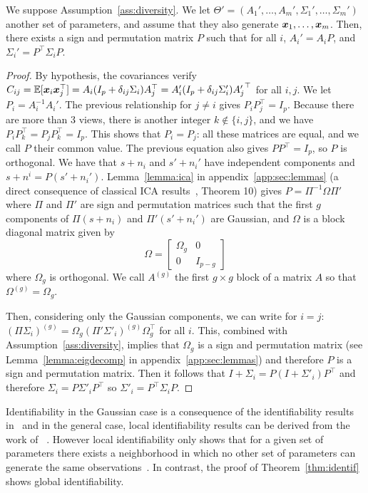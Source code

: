 \begin{theorem}[Identifiability]
\label{thm:identif}
We suppose Assumption~\ref{ass:diversity}. We let $\Theta'=(A_1', \dots, A_m', \Sigma_1', \dots,\Sigma_m')$ another set of parameters, and assume that they also generate $\boldsymbol{x}_1,\dots, \boldsymbol{x}_m$. Then, there exists a sign and permutation matrix $P$ such that for all $i$, $A_i'=A_iP$, and $\Sigma_i'= P^{\top} \Sigma_i P$.
\end{theorem}
\label{proof:identif}
\begin{proof}
By hypothesis, the covariances verify $C_{ij} =\mathbb{E}[\boldsymbol{x}_i\boldsymbol{x}_j^\top] = A_i(I_p + \delta_{ij}\Sigma_i)A_j^{\top} = A'_i(I_p + \delta_{ij}\Sigma'_i){A'_j}^{\top}$ for all $i, j$. We let $P_i=A_i^{-1}A_i'$. The previous relationship for $j\neq i$ gives $P_iP_j^{\top} = I_p$. Because there are more than 3 views, there is another integer $k \notin\{i,j\}$, and we have $P_iP_k^{\top}= P_jP_k^{\top}=I_p$. This shows that $P_i = P_j$: all these matrices are equal, and we call $P$ their common value. The previous equation also gives $PP^{\top} = I_p$, so $P$ is orthogonal. 
%
We have that $s + n_i$ and $s' + n_i'$ have independent components and $s + n^i
= P(s' + n_i')$. Lemma~\ref{lemma:ica} in appendix~\ref{app:sec:lemmas} (a direct consequence of classical ICA results~\cite{comon1994independent}, Theorem 10) gives $P=\Pi^{-1} \Omega \Pi'$ where $\Pi$ and $\Pi'$ are sign and permutation matrices such that the first $g$ components of $\Pi(s + n_i)$ and $\Pi'(s' + n_i')$ are Gaussian, and $\Omega$ is a block diagonal matrix given by
\[
\Omega = \begin{bmatrix} \Omega_g & 0 \\ 0 & I_{p - g} \end{bmatrix}
\]
where $\Omega_g$ is orthogonal.
%
We call $A^{(g)}$ the first $g \times g$ block of a matrix $A$ so that $\Omega^{(g)} = \Omega_g$.

Then, considering only the Gaussian components, we can write for $i=j$:  
$(\Pi \Sigma_i)^{(g)} = \Omega_g (\Pi' \Sigma'_i)^{(g)} \Omega_g^{\top}$ for all
$i$. This, combined with Assumption~\ref{ass:diversity}, implies that $\Omega_g$
is a sign and permutation matrix (see Lemma~\ref{lemma:eigdecomp} in appendix~\ref{app:sec:lemmas}) and therefore $P$ is a sign and permutation matrix. Then it follows that $I + \Sigma_i = P(I + \Sigma'_i)P^{\top}$ and therefore $\Sigma_i = P \Sigma'_i P^{\top}$ so $\Sigma'_i = P^{\top} \Sigma_i P$.
\end{proof}

Identifiability in the Gaussian case is a consequence of the identifiability results in~\cite{via2011joint} and in the general case, local identifiability results can be derived from the work of ~\cite{anderson2014independent}. 
%
However local identifiability only shows that for a given set of parameters there exists a neighborhood in which no other set of parameters can generate the same observations~\cite{rothenberg1971identification}. In contrast, the proof of Theorem~\ref{thm:identif} shows global identifiability.

